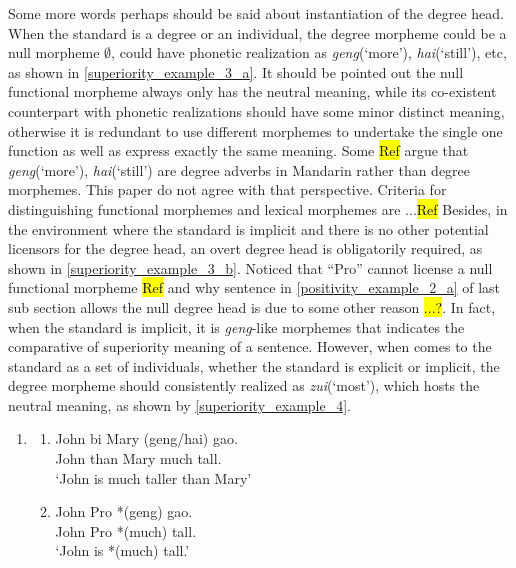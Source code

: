 \documentclass{ctexart}
\begin{document}
Some more words perhaps should be said about instantiation of the degree head. When the standard is a degree or an individual, the degree morpheme could be a null morpheme $\emptyset$, could have phonetic realization as \textit{geng}(`more'), \textit{hai}(`still'), etc, as shown in \ref{superiority_example_3_a}. It should be pointed out the null functional morpheme  always only has the neutral meaning, while its co-existent counterpart with phonetic realizations should have some minor distinct meaning, otherwise it is redundant to use  different morphemes to undertake the single one function as well as express exactly the same meaning. Some \hl{Ref} argue that \textit{geng}(`more'), \textit{hai}(`still') are degree adverbs in Mandarin rather than degree morphemes. This paper do not agree with that perspective. Criteria for distinguishing functional morphemes and lexical morphemes are ...\hl{Ref} Besides, in the environment where the standard is implicit and there is no other potential licensors for the degree head, an overt degree head is obligatorily required, as shown in \ref{superiority_example_3_b}. Noticed that ``Pro'' cannot license a null functional morpheme \hl{Ref} and why sentence in \ref{positivity_example_2_a} of last sub section allows the null degree head is due to some other reason \hl{...?}. In fact, when the standard is implicit, it is \textit{geng}-like morphemes that indicates the comparative of superiority meaning of a sentence. However, when comes to the standard as a set of individuals, whether the standard is explicit or implicit, the degree morpheme should consistently realized as \textit{zui}(`most'), which hosts the neutral meaning, as shown by \ref{superiority_example_4}.

\begin{enumerate}
    \item \label{superiority_example_3}
    \begin{enumerate}
        \item \label{superiority_example_3_a}
        John bi Mary (geng/hai) gao. \\
        John than Mary much tall. \\
        `John is much taller than Mary'

        \item \label{superiority_example_3_b}
        John Pro *(geng) gao. \\
        John Pro *(much) tall.  \\
        `John is *(much) tall.'

    \end{enumerate}
\end{enumerate}
\end{document}
